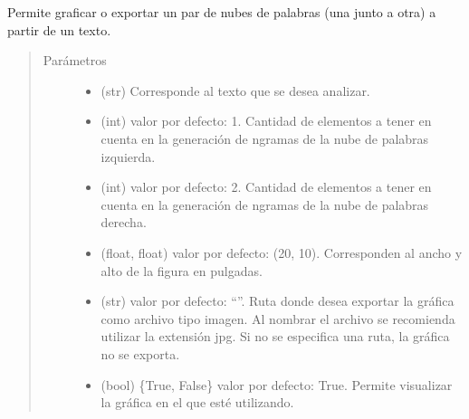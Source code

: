 \documentclass[letterpaper,10pt,openany,spanish]{sphinxmanual}
\begin{document}
\begin{fulllineitems}
\label{\detokenize{funciones/exploracion:exploracion.par_nubes}}
Permite graficar o exportar un par de nubes de palabras (una junto a otra) a partir de un texto.
\begin{quote}\begin{description}
\item[{Parámetros}] \leavevmode\begin{itemize}
\item {} 
 \textendash{} (str) Corresponde al texto que se desea analizar.

\item {} 
 \textendash{} (int) valor por defecto: 1. Cantidad de elementos a tener en cuenta en la generación de n\sphinxhyphen{}gramas de la nube de palabras izquierda.

\item {} 
 \textendash{} (int) valor por defecto: 2. Cantidad de elementos a tener en cuenta en la generación de n\sphinxhyphen{}gramas de la nube de palabras derecha.

\item {} 
 \textendash{} (float, float) valor por defecto: (20, 10). Corresponden al ancho y alto de la figura en pulgadas.

\item {} 
 \textendash{} (str) valor por defecto: “”. Ruta donde desea exportar la gráfica como archivo tipo imagen. Al nombrar el archivo se recomienda utilizar la extensión jpg. Si no se especifica una ruta, la gráfica no se exporta.

\item {} 
 \textendash{} (bool) \{True, False\} valor por defecto: True. Permite visualizar la gráfica en el  que esté utilizando.

\end{itemize}

\end{description}\end{quote}

\end{fulllineitems}
\end{document}
